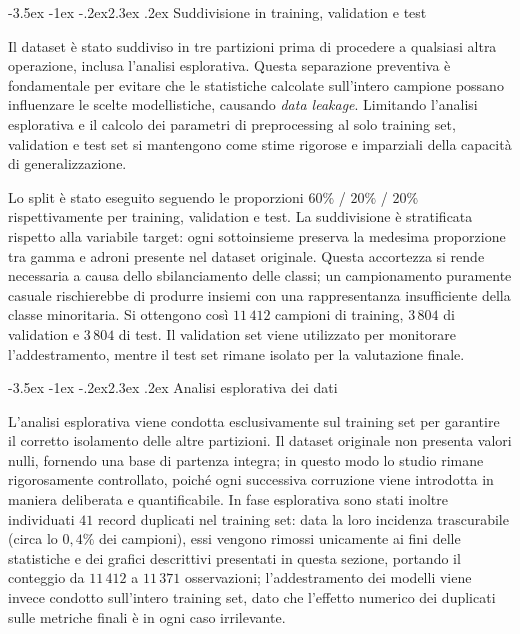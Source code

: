 \documentclass[12pt,a4paper]{article}
\makeatletter
\renewcommand\section{\@startsection{section}{1}{\z@}%
  {-3.5ex \@plus -1ex \@minus -.2ex}{2.3ex \@plus.2ex}%
  {\normalfont\Large\bfseries}}
\makeatother
\begin{document}
\section{Suddivisione in training, validation e test}\label{sec:split}

Il dataset è stato suddiviso in tre partizioni prima di procedere a qualsiasi 
altra operazione, inclusa l'analisi esplorativa. Questa separazione preventiva 
è fondamentale per evitare che le statistiche calcolate sull'intero campione 
possano influenzare le scelte modellistiche, causando \textit{data leakage}. 
Limitando l'analisi esplorativa e il calcolo dei parametri di preprocessing al 
solo training set, validation e test set si mantengono come stime rigorose e 
imparziali della capacità di generalizzazione.

Lo split è stato eseguito seguendo le proporzioni $60\%$ / $20\%$ / $20\%$ 
rispettivamente per training, validation e test. La suddivisione è stratificata 
rispetto alla variabile target: ogni sottoinsieme preserva la medesima 
proporzione tra gamma e adroni presente nel dataset originale. Questa 
accortezza si rende necessaria a causa dello sbilanciamento delle classi; 
un campionamento puramente casuale rischierebbe di produrre insiemi con una 
rappresentanza insufficiente della classe minoritaria. Si ottengono così 
$11\,412$ campioni di training, $3\,804$ di validation e $3\,804$ di test. Il 
validation set viene utilizzato per monitorare l'addestramento, mentre il test 
set rimane isolato per la valutazione finale.

\section{Analisi esplorativa dei dati}\label{sec:eda}

L'analisi esplorativa viene condotta esclusivamente sul training set per
garantire il corretto isolamento delle altre partizioni. Il dataset originale
non presenta valori nulli, fornendo una base di partenza integra; in questo
modo lo studio rimane rigorosamente controllato, poiché ogni successiva
corruzione viene introdotta in maniera deliberata e quantificabile. In fase
esplorativa sono stati inoltre individuati $41$ record duplicati nel training
set: data la loro incidenza trascurabile (circa lo $0{,}4\%$ dei campioni),
essi vengono rimossi unicamente ai fini delle statistiche e dei grafici
descrittivi presentati in questa sezione, portando il conteggio da $11\,412$ a
$11\,371$ osservazioni; l'addestramento dei modelli viene invece condotto
sull'intero training set, dato che l'effetto numerico dei duplicati sulle
metriche finali è in ogni caso irrilevante.
\end{document}
